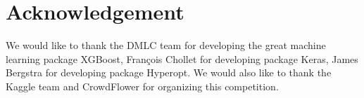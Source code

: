 \documentclass[12pt]{article}
\begin{document}
\section{Acknowledgement}
We would like to thank the DMLC team for developing the great machine learning package XGBoost, Fran\c{c}ois Chollet for developing package Keras, James Bergstra for developing package Hyperopt. We would also like to thank the Kaggle team and CrowdFlower for organizing this competition.



\end{document}

